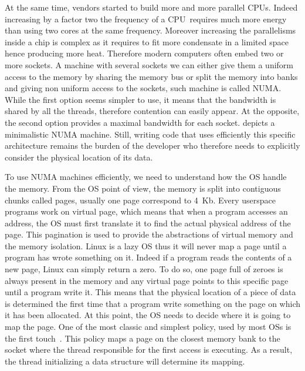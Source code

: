 At the same time, vendors started to build more and more parallel \glspl{CPU}.
Indeed increasing by a factor two the frequency of a \gls{CPU} requires much more energy than using two cores at the same frequency.
Moreover increasing the parallelisms inside a chip is complex as it requires to fit more condensate in a limited space hence producing more heat.
Therefore modern computers often embed two or more sockets.
A machine with several sockets we can either give them a uniform access to the memory by sharing the memory bus or split the memory into banks and giving non uniform access to the sockets, such machine is called \gls{NUMA}.
While the first option seems simpler to use, it means that the bandwidth is shared by all the threads, therefore contention can easily appear.
At the opposite, the second option provides a maximal bandwidth for each socket.
 depicts a minimalistic \gls{NUMA} machine.
Still, writing code that uses efficiently this specific architecture remains the burden of the developer who therefore needs to explicitly consider the physical location of its data.

To use \gls{NUMA} machines efficiently, we need to understand how the \gls{OS} handle the memory.
From the \gls{OS} point of view, the memory is split into contiguous chunks called pages, usually one page correspond to \SI{4}{Kb}.
Every userspace programs work on virtual page, which means that when a program accesses an address, the \gls{OS} must first translate it to find the actual physical address of the page.
This pagination is used to provide the abstractions of virtual memory and the memory isolation.
Linux is a lazy \gls{OS} thus it will never map a page until a program has wrote something on it.
Indeed if a program reads the contents of a new page, Linux can simply return a zero.
To do so, one page full of zeroes is always present in the memory and any virtual page points to this specific page until a program write it.
This means that the physical location of a piece of data is determined the first time that a program write something on the page on which it has been allocated.
At this point, the \gls{OS} needs to decide where it is going to map the page.
One of the most classic and simplest policy, used by most \glspl{OS} is the first touch~\cite{Marchetti95Using}.
This policy maps a page on the closest memory bank to the socket where the thread responsible for the first access is executing.
As a result, the thread initializing a data structure will determine its mapping.

